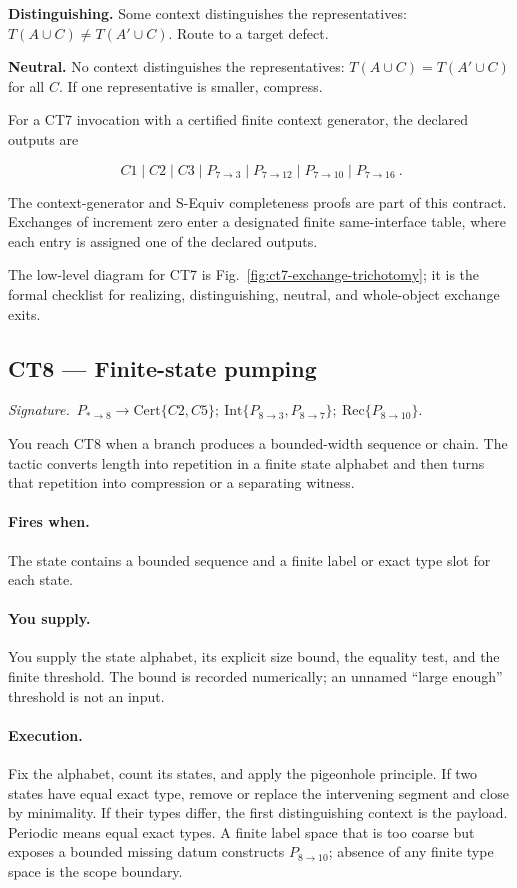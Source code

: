 \documentclass[
  11pt,
]{article}
\theoremstyle{definition}
\newcommand{\ctsignature}[1]{\par\noindent\emph{Signature.}\ #1\par\medskip}
\newcommand{\ctcert}[1]{\mathrm{Cert}\{#1\}}
\newcommand{\ctint}[1]{\mathrm{Int}\{#1\}}
\newcommand{\ctrec}[1]{\mathrm{Rec}\{#1\}}
\newcommand{\ctpar}[1]{\paragraph{#1.}}
\begin{document}
\textbf{Distinguishing.} Some context distinguishes the representatives:
$T(A\cup C)\ne T(A'\cup C)$. Route to a target defect.

\textbf{Neutral.} No context distinguishes the representatives:
$T(A\cup C)=T(A'\cup C)$ for all $C$. If one representative is
smaller, compress.

For a CT7 invocation with a certified finite context generator, the
declared outputs are

\[
\boxed{\ C1\mid C2\mid C3\mid
P_{7\to3}\mid P_{7\to12}\mid P_{7\to10}\mid P_{7\to16}\ }.
\]

The context-generator and S-Equiv completeness proofs are part of this
contract. Exchanges of increment zero enter a designated finite
same-interface table, where each entry is assigned one of the declared
outputs.

The low-level diagram for CT7 is Fig.~\ref{fig:ct7-exchange-trichotomy};
it is the formal checklist for realizing, distinguishing, neutral, and
whole-object exchange exits.



\subsection{CT8 --- Finite-state pumping}\label{ct:8}\label{the-finite-state-pumping-principle}
\ctsignature{\(P_{\ast\to8}\to \ctcert{C2,C5};\ \ctint{P_{8\to3},P_{8\to7}};\ \ctrec{P_{8\to10}}\).}

You reach CT8 when a branch produces a bounded-width sequence or chain.
The tactic converts length into repetition in a finite state alphabet and
then turns that repetition into compression or a separating witness.

\ctpar{Fires when}
The state contains a bounded sequence and a finite label or exact type
slot for each state.

\ctpar{You supply}
You supply the state alphabet, its explicit size bound, the equality
test, and the finite threshold.  The bound is recorded numerically; an
unnamed ``large enough'' threshold is not an input.

\ctpar{Execution}
Fix the alphabet, count its states, and apply the pigeonhole principle.
If two states have equal exact type, remove or replace the intervening
segment and close by minimality.  If their types differ, the first
distinguishing context is the payload.  Periodic means equal exact types.
A finite label space that is too coarse but exposes a bounded missing
datum constructs \(P_{8\to10}\); absence of any finite type space is the
scope boundary.
\end{document}
